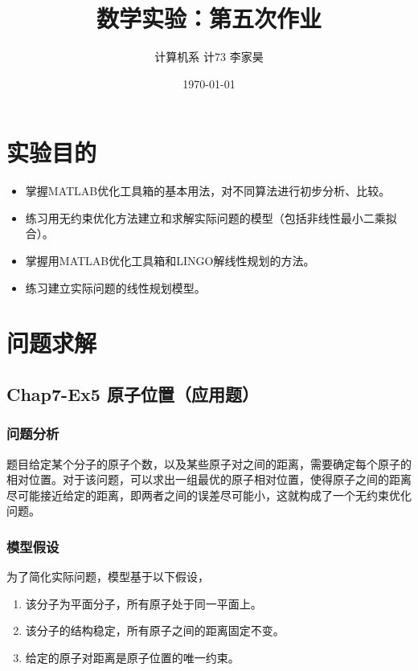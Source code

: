 \documentclass[12pt,a4paper]{article}
\title{数学实验：第五次作业}
\author{计算机系 \quad 计73 \quad 2017011620 \quad 李家昊}
\date{\today}
\begin{document}
\maketitle

\section{实验目的}

\begin{itemize}
    \item 掌握MATLAB优化工具箱的基本用法，对不同算法进行初步分析、比较。
    \item 练习用无约束优化方法建立和求解实际问题的模型（包括非线性最小二乘拟合）。
    \item 掌握用MATLAB优化工具箱和LINGO解线性规划的方法。
    \item 练习建立实际问题的线性规划模型。
\end{itemize}

\section{问题求解}

\subsection{Chap7-Ex5 原子位置（应用题）}

\subsubsection{问题分析}

题目给定某个分子的原子个数，以及某些原子对之间的距离，需要确定每个原子的相对位置。对于该问题，可以求出一组最优的原子相对位置，使得原子之间的距离尽可能接近给定的距离，即两者之间的误差尽可能小，这就构成了一个无约束优化问题。

\subsubsection{模型假设}

为了简化实际问题，模型基于以下假设，
\begin{enumerate}
    \item 该分子为平面分子，所有原子处于同一平面上。
    \item 该分子的结构稳定，所有原子之间的距离固定不变。
    \item 给定的原子对距离是原子位置的唯一约束。
\end{enumerate}
\end{document}
